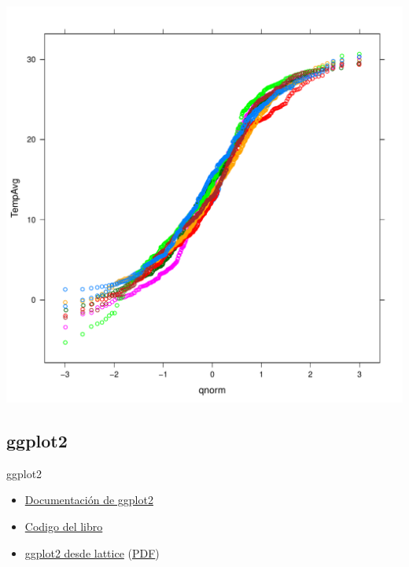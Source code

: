 \documentclass[xcolor={usenames,svgnames,dvipsnames}]{beamer}
\begin{document}
\begin{frame}[label=sec-2-1-55]{}
\includegraphics[width=.9\linewidth]{figs/qqNorm.pdf}
\end{frame}


\subsection{ggplot2}
\label{sec-2-2}

\begin{frame}[label=sec-2-2-1]{ggplot2}
\begin{itemize}
\item \href{http://docs.ggplot2.org/current/}{Documentación de ggplot2}
\item \href{http://ggplot2.org/book/}{Codigo del libro}
\item \href{http://learnr.wordpress.com/2009/06/28/ggplot2-version-of-figures-in-lattice-multivariate-data-visualization-with-r-part-1/}{ggplot2 desde lattice} (\href{http://learnr.files.wordpress.com/2009/08/latbook.pdf}{PDF})
\end{itemize}
\end{frame}
\end{document}
